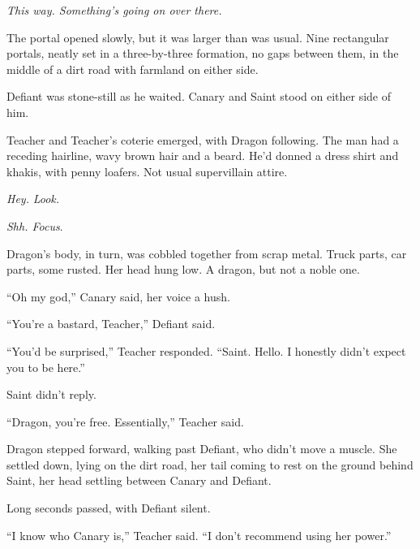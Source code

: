 \emph{This way.  Something's going on over there.}



\blacksquare



The portal opened slowly, but it was larger than was usual.  Nine rectangular portals, neatly set in a three-by-three formation, no gaps between them, in the middle of a dirt road with farmland on either side.



Defiant was stone-still as he waited.  Canary and Saint stood on either side of him.



Teacher and Teacher's coterie emerged, with Dragon following.  The man had a receding hairline, wavy brown hair and a beard.  He'd donned a dress shirt and khakis, with penny loafers.  Not usual supervillain attire.



\emph{Hey. }\emph{Look}\emph{.}



\emph{Shh.  Focus}.



Dragon's body, in turn, was cobbled together from scrap metal.  Truck parts, car parts, some rusted.  Her head hung low.  A dragon, but not a noble one.



``Oh my god,'' Canary said, her voice a hush.



``You're a bastard, Teacher,'' Defiant said.



``You'd be surprised,'' Teacher responded.  ``Saint.  Hello.  I honestly didn't expect you to be here.''



Saint didn't reply.



``Dragon, you're free.  Essentially,'' Teacher said.



Dragon stepped forward, walking past Defiant, who didn't move a muscle.  She settled down, lying on the dirt road, her tail coming to rest on the ground behind Saint, her head settling between Canary and Defiant.



Long seconds passed, with Defiant silent.



``I know who Canary is,'' Teacher said.  ``I don't recommend using her power.''



